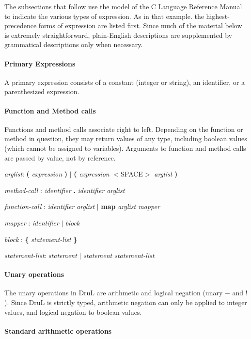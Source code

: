 \documentclass[11pt,twoside]{article}
\begin{document}
The subsections that follow use the model of the C Language Reference Manual to indicate the various types of expression.  As in that example. the highest-precedence forms of expression are listed first.  Since much of the material below is extremely straightforward, plain-English descriptions are supplemented by grammatical descriptions only when necessary.

\paragraph{Primary Expressions}

A primary expression consists of a constant (integer or string), an identifier, or a parenthesized expression.

\paragraph{Function and Method calls}

Functions and method calls associate right to left.  Depending on the function or method in question, they may return values of any type, including boolean values (which cannot be assigned to variables). Arguments to function and method calls are passed by value, not by reference.

\emph{arglist}: \textbf ( \emph{expression} \textbf ) $|$  \textbf ( \emph{expression} 
$<$SPACE$>$ \emph{arglist} \textbf )

\emph{method-call} : \emph{identifier} \textbf . \emph{identifier arglist} 

\emph{function-call} : \emph{identifier} \emph{arglist} $|$ \textbf{map} \emph{arglist mapper}

\emph{mapper} : \emph{identifier} $|$ \emph{block}

\emph{block} : \textbf{\{} \emph{statement-list} \textbf{\}} 

\emph{statement-list}: \emph{statement} $|$ \emph{statement statement-list}

\paragraph{Unary operations}

The unary operations in DruL are arithmetic and logical negation (unary $-$ and $!$).  Since DruL is strictly typed, arithmetic negation can only be applied to integer values, and logical negation to boolean values.

\paragraph{Standard arithmetic operations}
\end{document}
